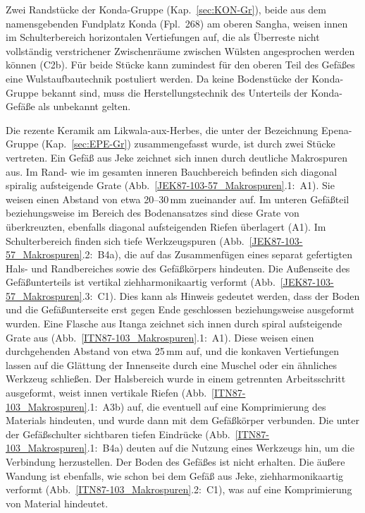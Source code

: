 \begin{multicols}{2}
Zwei Randstücke der Konda-Gruppe (Kap.~\ref{sec:KON-Gr}), beide aus dem namensgebenden Fundplatz Konda (Fpl.~268) am oberen \mbox{Sangha}, weisen innen im Schulterbereich horizontalen Vertiefungen auf, die als Überreste nicht vollständig verstrichener Zwischenräume zwischen Wülsten angesprochen werden können (C2b). Für beide Stücke kann zumindest für den oberen Teil des Gefäßes eine Wulstaufbautechnik postuliert werden. Da keine Bodenstücke der Konda-Gruppe bekannt sind, muss die Herstellungstechnik des Unterteils der Konda-Gefäße als unbekannt gelten.

Die rezente Keramik am Likwala-aux-Herbes, die unter der Bezeichnung Epena-Gruppe (Kap.~\ref{sec:EPE-Gr}) zusammengefasst wurde, ist durch zwei Stücke vertreten. Ein Gefäß aus Jeke zeichnet sich innen durch deutliche Makrospuren aus. Im Rand- wie im gesamten inneren Bauchbereich befinden sich diagonal spiralig aufsteigende Grate (Abb.~\ref{JEK87-103-57_Makrospuren}.1:~A1). Sie weisen einen Abstand von etwa 20--30\,mm zueinander auf. Im unteren Gefäßteil beziehungsweise im Bereich des Bodenansatzes sind diese Grate von überkreuzten, ebenfalls diagonal aufsteigenden Riefen überlagert (A1). Im Schulterbereich finden sich tiefe Werkzeugspuren (Abb.~\ref{JEK87-103-57_Makrospuren}.2:~B4a), die auf das Zusammenfügen eines separat gefertigten Hals- und Randbereiches sowie des Gefäßkörpers hindeuten. Die Außenseite des Gefäßunterteils ist vertikal ziehharmonikaartig verformt (Abb.~\ref{JEK87-103-57_Makrospuren}.3:~C1). Dies kann als Hinweis gedeutet werden, dass der Boden und die Gefäßunterseite erst gegen Ende geschlossen beziehungsweise ausgeformt wurden. Eine Flasche aus Itanga zeichnet sich innen durch spiral aufsteigende Grate aus (Abb.~\ref{ITN87-103_Makrospuren}.1:~A1). Diese weisen einen durchgehenden Abstand von etwa 25\,mm auf, und die konkaven Vertiefungen lassen auf die Glättung der Innenseite durch eine Muschel oder ein ähnliches Werkzeug schließen. Der Halsbereich wurde in einem getrennten Arbeitsschritt ausgeformt, weist innen vertikale Riefen (Abb.~\ref{ITN87-103_Makrospuren}.1:~A3b) auf, die eventuell auf eine Komprimierung des Materials hindeuten, und wurde dann mit dem Gefäßkörper verbunden. Die unter der Gefäßschulter sichtbaren tiefen Eindrücke (Abb.~\ref{ITN87-103_Makrospuren}.1:~B4a) deuten auf die Nutzung eines Werkzeugs hin, um die Verbindung herzustellen. Der Boden des Gefäßes ist nicht erhalten. Die äußere Wandung ist ebenfalls, wie schon bei dem Gefäß aus Jeke, ziehharmonikaartig verformt (Abb.~\ref{ITN87-103_Makrospuren}.2:~C1), was auf eine Komprimierung von Material hindeutet.


\end{multicols}
